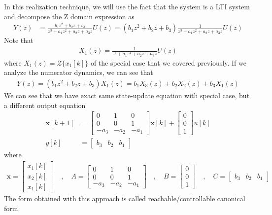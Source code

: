 \documentclass[twoside]{article}
\begin{document}
In this realization technique, we will use the fact that the system is
a LTI system and decompose the Z domain expression as
%
\begin{align*}
Y(z) &= \frac{b_1 z^2 + b_2 z + b_3}{z^3+ a_1
       z^2 + a_2 z + a_3 z} U(z) = ( b_1 z^2 + b_2 z + b_3 )
\frac{1}{z^3+ a_1
       z^2 + a_2 z + a_3 z} U(z)  
\end{align*}
%
Note that 
%
\begin{align*}
X_1(z) = 
\frac{1}{z^3+ a_1
       z^2 + a_2 z + a_3 z} U(z)  
\end{align*}
%
where $X_1(z) = \mathcal{Z} \lbrace x_1[k] \rbrace$ of the special case that we
covered previously. If we analyze the numerator dynamics, we can see that
%
\begin{align*}
Y(z) = ( b_1 z^2 + b_2 z + b_3 ) X_1(z) = b_1 X_3(z) + b_2 X_2(z) + b_3  X_1(z) 
\end{align*}
%
We can see that we have exact same state-update equation with special
case, but a different output equation 
%
\begin{align*}
  \mathbf{x}[k+1] &= \left[ \begin{array}{ccc} 0 & 1 & 0 \\ 0 & 0 & 1
    \\ -a_3 & -a_2 & -a_1 \end{array} \right] \mathbf{x}[k]
   + 
  \left[ \begin{array}{c} 0\\ 0 
    \\ 1 \end{array} \right] u[k]
\\
y[k] &= \left[ \begin{array}{ccc} b_3 &  b_2 & b_1 \end{array} \right]
\end{align*}
%
where 
%
\begin{align*}
\mathbf{x} = \left[ \begin{array}{c} x_1[k] \\ x_2[k] \\
x_1[k] \end{array} \right] \quad , \quad
A = \left[ \begin{array}{ccc} 0 & 1 & 0 \\ 0 & 0 & 1
    \\ -a_3 & -a_2 & -a_1 \end{array} \right]
\quad , \quad 
B = \left[ \begin{array}{c} 0\\ 0 
    \\ 1 \end{array} \right] \quad , \quad 
C = \left[ \begin{array}{ccc} b_3 &  b_2 & b_1 \end{array} \right]
\end{align*}
%
The form obtained with this approach is called
reachable/controllable canonical form. 
\end{document}
